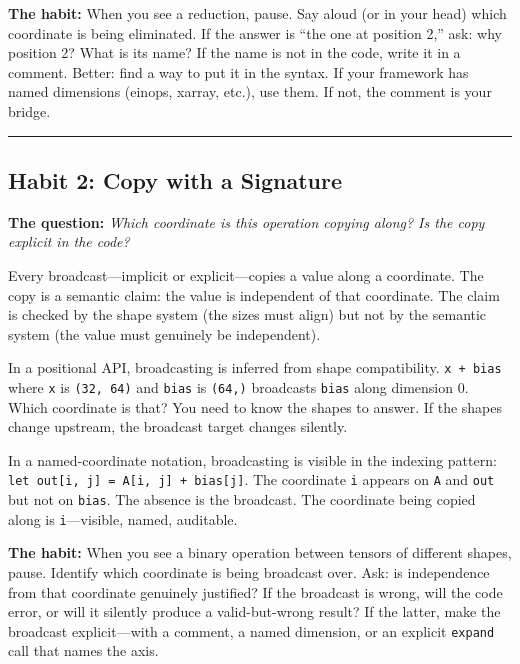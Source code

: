 \documentclass[11pt,]{article}
\begin{document}
\textbf{The habit:} When you see a reduction, pause. Say aloud (or in
your head) which coordinate is being eliminated. If the answer is ``the
one at position 2,'' ask: why position 2? What is its name? If the name
is not in the code, write it in a comment. Better: find a way to put it
in the syntax. If your framework has named dimensions (einops, xarray,
etc.), use them. If not, the comment is your bridge.

\begin{center}\rule{0.5\linewidth}{0.4pt}\end{center}

\hypertarget{habit-2-copy-with-a-signature}{%
\subsection{Habit 2: Copy with a
Signature}\label{habit-2-copy-with-a-signature}}

\textbf{The question:} \emph{Which coordinate is this operation copying
along? Is the copy explicit in the code?}

Every broadcast---implicit or explicit---copies a value along a
coordinate. The copy is a semantic claim: the value is independent of
that coordinate. The claim is checked by the shape system (the sizes
must align) but not by the semantic system (the value must genuinely be
independent).

In a positional API, broadcasting is inferred from shape compatibility.
\texttt{x\ +\ bias} where \texttt{x} is \texttt{(32,\ 64)} and
\texttt{bias} is \texttt{(64,)} broadcasts \texttt{bias} along dimension
0. Which coordinate is that? You need to know the shapes to answer. If
the shapes change upstream, the broadcast target changes silently.

In a named-coordinate notation, broadcasting is visible in the indexing
pattern: \texttt{let\ out{[}i,\ j{]}\ =\ A{[}i,\ j{]}\ +\ bias{[}j{]}}.
The coordinate \texttt{i} appears on \texttt{A} and \texttt{out} but not
on \texttt{bias}. The absence is the broadcast. The coordinate being
copied along is \texttt{i}---visible, named, auditable.

\textbf{The habit:} When you see a binary operation between tensors of
different shapes, pause. Identify which coordinate is being broadcast
over. Ask: is independence from that coordinate genuinely justified? If
the broadcast is wrong, will the code error, or will it silently produce
a valid-but-wrong result? If the latter, make the broadcast
explicit---with a comment, a named dimension, or an explicit
\texttt{expand} call that names the axis.
\end{document}
